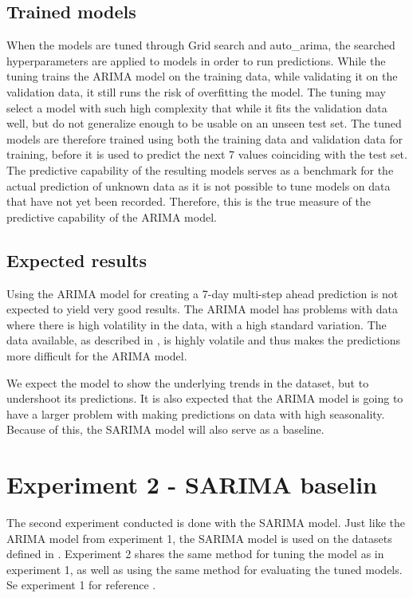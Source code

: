   \subsection{Trained models}
  When the models are tuned through Grid search and auto\_arima,
  the searched hyperparameters are applied to models in order to run predictions.
  While the tuning trains the ARIMA model on the training data, while validating it on the validation data,
  it still runs the risk of overfitting the model.
  The tuning may select a model with such high complexity that while it fits the validation data well,
  but do not generalize enough to be usable on an unseen test set.
  The tuned models are therefore trained using both the training data and validation data for training,
  before it is used to predict the next 7 values coinciding with the test set.
  The predictive capability of the resulting models serves as a benchmark for the actual prediction
  of unknown data as it is not possible to tune models on data that have not yet been recorded.
  Therefore, this is the true measure of the predictive capability of the ARIMA model.


  \subsection{Expected results}

  Using the ARIMA model for creating a 7-day multi-step ahead prediction is not expected to yield very good results.
  The ARIMA model has problems with data where there is high volatility in the data, with a high standard variation.
  The data available, as described in ,
  is highly volatile and thus makes the predictions more difficult for the ARIMA model.

  We expect the model to show the underlying trends in the dataset, but to
  undershoot its predictions.
  It is also expected that the ARIMA model is going to have a larger problem with making predictions on data with high seasonality.
  Because of this, the SARIMA model will also serve as a baseline.


  \section{Experiment 2 - SARIMA baselin}
  \label{section:Method:Experiment2}

  The second experiment conducted is done with the SARIMA model.
  Just like the ARIMA model from experiment 1, the SARIMA model is used on the datasets defined in .
  Experiment 2 shares the same method for tuning the model as in experiment 1,
  as well as using the same method for evaluating the tuned models.
  Se experiment 1 for reference .

